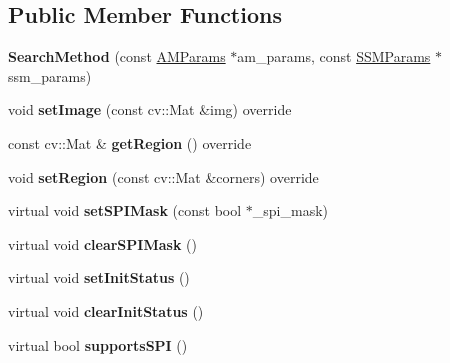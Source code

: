 \subsection*{Public Member Functions}
\begin{DoxyCompactItemize}
\item 
\hypertarget{classSearchMethod_a58b4b2c2b29bdcd5d445946d6e403561}{{\bfseries Search\-Method} (const \hyperlink{structAMParams}{A\-M\-Params} $\ast$am\-\_\-params, const \hyperlink{structSSMParams}{S\-S\-M\-Params} $\ast$ssm\-\_\-params)}\label{classSearchMethod_a58b4b2c2b29bdcd5d445946d6e403561}

\item 
\hypertarget{classSearchMethod_abea8b28600d6f234480b53a17f4012b5}{void {\bfseries set\-Image} (const cv\-::\-Mat \&img) override}\label{classSearchMethod_abea8b28600d6f234480b53a17f4012b5}

\item 
\hypertarget{classSearchMethod_a9992723b7292c321dd0dd167ed35c882}{const cv\-::\-Mat \& {\bfseries get\-Region} () override}\label{classSearchMethod_a9992723b7292c321dd0dd167ed35c882}

\item 
\hypertarget{classSearchMethod_a2a0a6dcb14553a99f333c4427981ad67}{void {\bfseries set\-Region} (const cv\-::\-Mat \&corners) override}\label{classSearchMethod_a2a0a6dcb14553a99f333c4427981ad67}

\item 
\hypertarget{classSearchMethod_aced70a0eb77b4eb97148b5e9435208f9}{virtual void {\bfseries set\-S\-P\-I\-Mask} (const bool $\ast$\-\_\-spi\-\_\-mask)}\label{classSearchMethod_aced70a0eb77b4eb97148b5e9435208f9}

\item 
\hypertarget{classSearchMethod_a8c29aa3e73fc13e0e71e58e07559125b}{virtual void {\bfseries clear\-S\-P\-I\-Mask} ()}\label{classSearchMethod_a8c29aa3e73fc13e0e71e58e07559125b}

\item 
\hypertarget{classSearchMethod_afb8afb221b80cb630a154ebe0a3b0313}{virtual void {\bfseries set\-Init\-Status} ()}\label{classSearchMethod_afb8afb221b80cb630a154ebe0a3b0313}

\item 
\hypertarget{classSearchMethod_a8a5577dba767d21ea5c52cace633f225}{virtual void {\bfseries clear\-Init\-Status} ()}\label{classSearchMethod_a8a5577dba767d21ea5c52cace633f225}

\item 
\hypertarget{classSearchMethod_a5032aac23da63bd5db97b9fa772757a0}{virtual bool {\bfseries supports\-S\-P\-I} ()}\label{classSearchMethod_a5032aac23da63bd5db97b9fa772757a0}


\end{DoxyCompactItemize}

